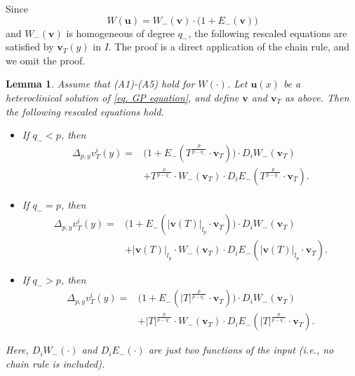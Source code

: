 \documentclass[11pt,twoside,reqno]{amsart}
\newtheorem{lemma}{Lemma}[section]
\numberwithin{equation}{section}
\begin{document}
Since $$W(\mathbf{u})=W_{-}(\mathbf{v})\cdot\Big(1+E_{-}(\mathbf{v})\Big)$$ and  $W_{-}(\mathbf{v})$ is homogeneous of degree $q_{-}$, the following rescaled equations are satisfied by $\mathbf{v}_{T}(y)$ in $I$. The proof is a direct application of the chain rule, and we omit the proof.
\begin{lemma}\label{lem. rescaled equation for v_T}
    Assume that (A1)-(A5) hold for $W(\cdot)$. Let $\mathbf{u}(x)$ be a heteroclinical solution of \eqref{eq. GP equation}, and define $\mathbf{v}$ and $\mathbf{v}_{T}$ as above.
Then the following rescaled equations hold.
\begin{itemize}
    \item[(1)] If $q_{-}<p$, then
    \begin{align*}
        \Delta_{p,y}v^{i}_{T}(y)=&\Big(1+E_{-}(T^{\frac{p}{p-q_{-}}}\cdot\mathbf{v}_{T})\Big)\cdot D_{i}W_{-}(\mathbf{v}_{T})\\
        &+T^{\frac{p}{p-q_{-}}}\cdot W_{-}(\mathbf{v}_{T})\cdot D_{i}E_{-}(T^{\frac{p}{p-q_{-}}}\cdot\mathbf{v}_{T}).
    \end{align*}
    \item[(2)] If $q_{-}=p$, then
    \begin{align*}
        \Delta_{p,y}v^{i}_{T}(y)=&\Big(1+E_{-}(|\mathbf{v}(T)|_{l_{p}}\cdot\mathbf{v}_{T})\Big)\cdot D_{i}W_{-}(\mathbf{v}_{T})\\
        &+|\mathbf{v}(T)|_{l_{p}}\cdot W_{-}(\mathbf{v}_{T})\cdot D_{i}E_{-}(|\mathbf{v}(T)|_{l_{p}}\cdot\mathbf{v}_{T}).
    \end{align*}
    \item[(3)] If $q_{-}>p$, then
    \begin{align*}
        \Delta_{p,y}v^{i}_{T}(y)=&\Big(1+E_{-}(|T|^{\frac{p}{p-q_{-}}}\cdot\mathbf{v}_{T})\Big)\cdot D_{i}W_{-}(\mathbf{v}_{T})\\
        &+|T|^{\frac{p}{p-q_{-}}}\cdot W_{-}(\mathbf{v}_{T})\cdot D_{i}E_{-}(|T|^{\frac{p}{p-q_{-}}}\cdot\mathbf{v}_{T}).
    \end{align*}
\end{itemize}
Here, $D_{i}W_{-}(\cdot)$ and $D_{i}E_{-}(\cdot)$ are just two functions of the input (i.e., no chain rule is included).
\end{lemma}
\end{document}
